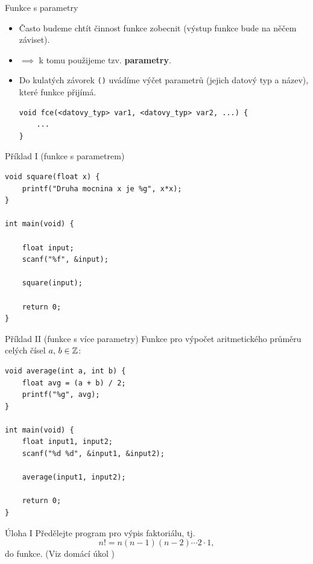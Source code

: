 \documentclass[14pt,aspectratio=169]{beamer}
\begin{document}
    \begin{frame}[t,fragile]{Funkce s parametry}
        \begin{itemize}
            \item Často budeme chtít činnost funkce zobecnit (výstup funkce bude na něčem záviset).
            \item $\implies$ k tomu použijeme tzv. \textbf{parametry}.
            \item Do kulatých závorek \texttt{()} uvádíme výčet parametrů (jejich datový typ a název), které funkce přijímá.
            \begin{lstlisting}
void fce(<datovy_typ> var1, <datovy_typ> var2, ...) {
    ...
}
            \end{lstlisting}
        \end{itemize}
    \end{frame}

    \begin{frame}[t,fragile]{Příklad I (funkce s parametrem)}
        \begin{lstlisting}
void square(float x) {
    printf("Druha mocnina x je %g", x*x);
}

int main(void) {

    float input;
    scanf("%f", &input);

    square(input);
    
    return 0;
}
        \end{lstlisting}
    \end{frame}

    \begin{frame}[t,fragile]{Příklad II (funkce s více parametry)}
        Funkce pro výpočet aritmetického průměru celých čísel $a,\,b\in\mathbb{Z}$:
        \begin{lstlisting}
void average(int a, int b) {
    float avg = (a + b) / 2;
    printf("%g", avg);
}

int main(void) {
    float input1, input2;
    scanf("%d %d", &input1, &input2);

    average(input1, input2);
    
    return 0;
}
        \end{lstlisting}
    \end{frame}

    \begin{frame}{Úloha I}
        Předělejte program pro výpis faktoriálu, tj.
        \begin{equation*}
            n!=n(n-1)(n-2)\cdots 2\cdot 1,
        \end{equation*}
        do funkce. (Viz domácí úkol )
    \end{frame}
\end{document}
